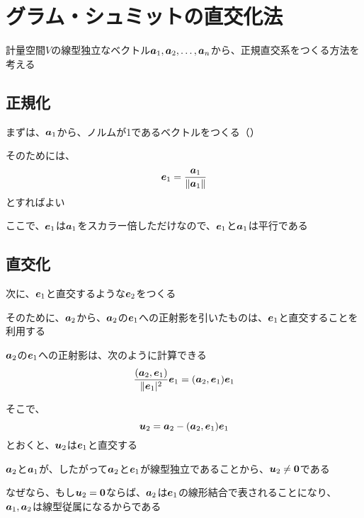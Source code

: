 \documentclass[../../../topic_linear-algebra]{subfiles}
\begin{document}
\sectionline
\section{グラム・シュミットの直交化法}

計量空間$V$の線型独立なベクトル$\vb*{a}_1, \vb*{a}_2, \ldots, \vb*{a}_n$から、正規直交系をつくる方法を考える

\subsection{正規化}

まずは、$\vb*{a}_1$から、ノルムが1であるベクトルをつくる（）

そのためには、
\begin{equation*}
  \vb*{e}_1 = \frac{\vb*{a}_1}{\|\vb*{a}_1\|}
\end{equation*}
とすればよい

ここで、$\vb*{e}_1$は$\vb*{a}_1$をスカラー倍しただけなので、$\vb*{e}_1$と$\vb*{a}_1$は平行である

\subsection{直交化}

次に、$\vb*{e}_1$と直交するような$\vb*{e}_2$をつくる

そのために、$\vb*{a}_2$から、$\vb*{a}_2$の$\vb*{e}_1$への正射影を引いたものは、$\vb*{e}_1$と直交することを利用する

\br

$\vb*{a}_2$の$\vb*{e}_1$への正射影は、次のように計算できる
\begin{equation*}
  \frac{(\vb*{a}_2, \vb*{e}_1)}{\|\vb*{e}_1|^2} \vb*{e}_1 = (\vb*{a}_2, \vb*{e}_1) \vb*{e}_1
\end{equation*}

そこで、
\begin{equation*}
  \vb*{u}_2 = \vb*{a}_2 - (\vb*{a}_2, \vb*{e}_1) \vb*{e}_1
\end{equation*}
とおくと、$\vb*{u}_2$は$\vb*{e}_1$と直交する

\br

$\vb*{a}_2$と$\vb*{a}_1$が、したがって$\vb*{a}_2$と$\vb*{e}_1$が線型独立であることから、$\vb*{u}_2 \neq \vb*{0}$である

なぜなら、もし$\vb*{u}_2 = \vb*{0}$ならば、$\vb*{a}_2$は$\vb*{e}_1$の線形結合で表されることになり、$\vb*{a}_1, \vb*{a}_2$は線型従属になるからである
\end{document}
